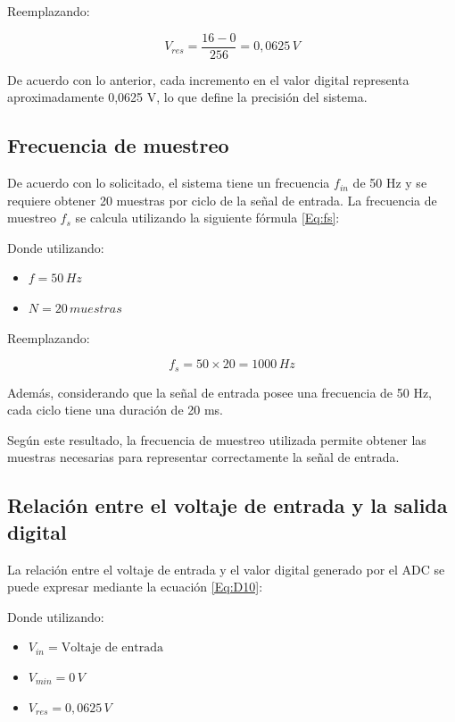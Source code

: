 \documentclass[12pt,letterpaper]{article}
\begin{document}
    Reemplazando:
    
    \[
    V_{res} = \frac{16 - 0}{256} = 0,0625 \, V
    \]
    
    De acuerdo con lo anterior, cada incremento en el valor digital representa aproximadamente 0,0625 V, lo que define la precisión del sistema.

    \subsection{Frecuencia de muestreo}

    De acuerdo con lo solicitado, el sistema tiene un frecuencia $f_{in}$ de 50 Hz y se requiere obtener 20 muestras por ciclo de la señal de entrada. La frecuencia de muestreo $f_s$ se calcula utilizando la siguiente fórmula \ref{Eq:fs}:
    
    Donde utilizando:
    
    \begin{itemize}
        \item $f = 50 \, Hz$
        \item $N = 20 \, muestras$
    \end{itemize}
    
    Reemplazando:
    
    \[
    f_s = 50 \times 20 = 1000 \, Hz
    \]
    
    Además, considerando que la señal de entrada posee una frecuencia de 50 Hz, cada ciclo tiene una duración de 20 ms.
    
    Según este resultado, la frecuencia de muestreo utilizada permite obtener las muestras necesarias para representar correctamente la señal de entrada.

    \subsection*{Relación entre el voltaje de entrada y la salida digital}

    La relación entre el voltaje de entrada y el valor digital generado por el ADC se puede expresar mediante la ecuación \ref{Eq:D10}:
    
    Donde utilizando:
    
    \begin{itemize}
        \item $V_{in} = \text{Voltaje de entrada}$
        \item $V_{min} = 0 \, V$
        \item $V_{res} = 0,0625 \, V$
    \end{itemize}
\end{document}
